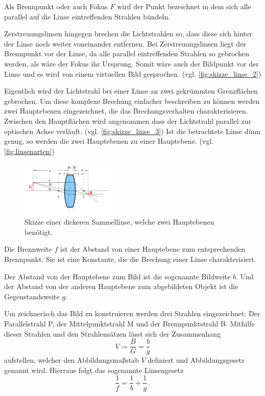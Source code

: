 Als Brennpunkt oder auch Fokus $F$ wird der Punkt bezeichnet in dem sich alle parallel auf die Linse eintreffenden Strahlen bündeln.

Zerstreuungslinsen hingegen brechen die Lichtstrahlen so, dass diese sich hinter der Linse noch weiter voneinander entfernen.
Bei Zerstreuungslinsen liegt der Brennpunkt vor der Linse, da alle parallel eintreffenden Strahlen so gebrochen werden, als wäre der Fokus ihr Ursprung.
Somit wäre auch der Bildpunkt vor der Linse und es wird von einem virtuellen Bild gesprochen. (vgl. \autoref{fig:skizze_linse_2})

Eigentlich wird der Lichtstrahl bei einer Linse an zwei gekrümmten Grenzflächen gebrochen. 
Um diese komplexe Brechung einfacher beschreiben zu können werden zwei Hauptebenen eingezeichnet, die das Brechungsverhalten charakterisieren. 
Zwischen den Hauptflächen wird angenommen dass der Lichtstrahl parallel zur optischen Achse verläuft. (vgl. \autoref{fig:skizze_linse_3})
Ist die betrachtete Linse dünn genug, so werden die zwei Hauptebenen zu einer Hauptebene. (vgl. \autoref{fig:linsenarten})

\begin{figure}
    \centering
    \includegraphics[width=0.4\textwidth]{images/skizze_linse_3.png}
    \caption{Skizze einer dickeren Sammellinse, welche zwei Hauptebenen benötigt.\cite{V408}}
    \label{fig:skizze_linse_3}
\end{figure}

Die Brennweite $f$ ist der Abstand von einer Hauptebene zum entsprechenden Brennpunkt. 
Sie ist eine Konstante, die die Brechung einer Linse charakterisiert.

Der Abstand von der Hauptebene zum Bild ist die sogenannte Bildweite $b$.
Und der Abstand von der anderen Hauptebene zum abgebildeten Objekt ist die Gegenstandsweite $g$.

Um zeichnerisch das Bild zu konstruieren werden drei Strahlen eingezeichnet: Der Parallelstrahl P, der Mittelpunktstrahl M und der Brennpunktstrahl B. 
Mithilfe dieser Strahlen und den Strahlensätzen lässt sich der Zusammenhang
\begin{equation}
    V \coloneqq \frac{B}{G} = \frac{b}{g}
    \label{eq:abbildungsgesetz}
\end{equation}
aufstellen, welcher den Abbildungsmaßstab $V$ definiert und Abbildungsgesetz genannt wird.
Hierraus folgt das sogenannte Linsengesetz
\begin{equation}
    \frac{1}{f} = \frac{1}{b} + \frac{1}{g} \, .
    \label{eq:linsengesetz}
\end{equation}

